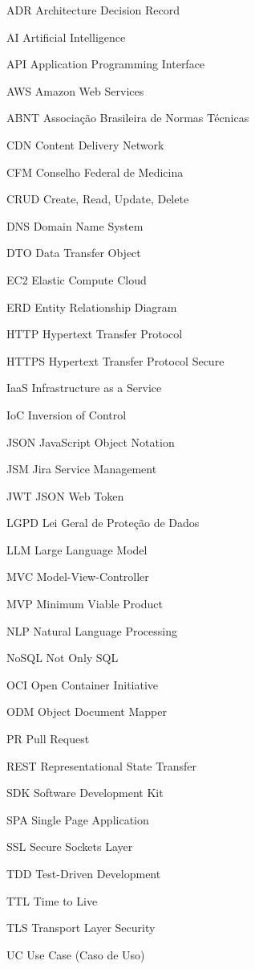 \begin{siglas}
  \item[ADR]   Architecture Decision Record
  \item[AI]    Artificial Intelligence
  \item[API]   Application Programming Interface
  \item[AWS]   Amazon Web Services
  \item[ABNT]  Associação Brasileira de Normas Técnicas
  \item[CDN]   Content Delivery Network
  \item[CFM]   Conselho Federal de Medicina
  \item[CRUD]  Create, Read, Update, Delete
  \item[DNS]   Domain Name System
  \item[DTO]   Data Transfer Object
  \item[EC2]   Elastic Compute Cloud
  \item[ERD]   Entity Relationship Diagram
  \item[HTTP]  Hypertext Transfer Protocol
  \item[HTTPS] Hypertext Transfer Protocol Secure
  \item[IaaS]  Infrastructure as a Service
  \item[IoC]   Inversion of Control
  \item[JSON]  JavaScript Object Notation
  \item[JSM]   Jira Service Management
  \item[JWT]   JSON Web Token
  \item[LGPD]  Lei Geral de Proteção de Dados
  \item[LLM]   Large Language Model
  \item[MVC]   Model-View-Controller
  \item[MVP]   Minimum Viable Product
  \item[NLP]   Natural Language Processing
  \item[NoSQL] Not Only SQL
  \item[OCI]   Open Container Initiative
  \item[ODM]   Object Document Mapper
  \item[PR]    Pull Request
  \item[REST]  Representational State Transfer
  \item[SDK]   Software Development Kit
  \item[SPA]   Single Page Application
  \item[SSL]   Secure Sockets Layer
  \item[TDD]   Test-Driven Development
  \item[TTL]   Time to Live
  \item[TLS]   Transport Layer Security
  \item[UC]    Use Case (Caso de Uso)
\end{siglas}